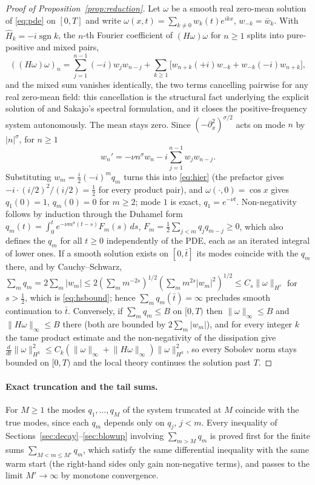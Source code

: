 \documentclass[11pt,a4paper]{article}
\theoremstyle{plain}
\theoremstyle{definition}
\newcommand{\nrm}[1]{\lVert #1 \rVert}
\newcommand{\abs}[1]{\lvert #1 \rvert}
\DeclareMathOperator{\sgn}{sgn}
\begin{document}
\begin{proof}[Proof of Proposition~\ref{prop:reduction}]
Let $\omega$ be a smooth real zero-mean solution of \eqref{eq:pde} on $[0,T]$ and write $\omega(x,t)=\sum_{k\ne0}w_k(t)e^{ikx}$, $w_{-k}=\bar w_k$. With $\hat H_k=-i\sgn k$, the $n$-th Fourier coefficient of $(H\omega)\omega$ for $n\ge1$ splits into pure-positive and mixed pairs,
\[
((H\omega)\omega)_n=\sum_{j=1}^{n-1}(-i)w_jw_{n-j}+\sum_{k\ge1}\big[w_{n+k}(+i)w_{-k}+w_{-k}(-i)w_{n+k}\big],
\]
and the mixed sum vanishes identically, the two terms cancelling pairwise for any real zero-mean field: this cancellation is the structural fact underlying the explicit solution of \cite{CLM85} and Sakajo's spectral formulation, and it closes the positive-frequency system autonomously. The mean stays zero. Since $(-\partial_x^2)^{\sigma/2}$ acts on mode $n$ by $\abs n^\sigma$, for $n\ge1$
\[
w_n'=-\nu n^\sigma w_n-i\sum_{j=1}^{n-1}w_jw_{n-j}.
\]
Substituting $w_m=\tfrac i2(-i)^mq_m$ turns this into \eqref{eq:hier} (the prefactor gives $-i\cdot(i/2)^2/(i/2)=\tfrac12$ for every product pair), and $\omega(\cdot,0)=\cos x$ gives $q_1(0)=1$, $q_m(0)=0$ for $m\ge2$; mode $1$ is exact, $q_1=e^{-\nu t}$. Non-negativity follows by induction through the Duhamel form $q_m(t)=\int_0^te^{-\nu m^\sigma(t-s)}F_m(s)\,ds$, $F_m=\tfrac12\sum_{j<m}q_jq_{m-j}\ge0$, which also defines the $q_m$ for all $t\ge0$ independently of the PDE, each as an iterated integral of lower ones. If a smooth solution exists on $[0,\bar t]$ its modes coincide with the $q_m$ there, and by Cauchy--Schwarz, $\sum_mq_m=2\sum_m\abs{w_m}\le2(\sum_mm^{-2s})^{1/2}(\sum_mm^{2s}\abs{w_m}^2)^{1/2}\le C_s\nrm{\omega}_{H^s}$ for $s>\tfrac12$, which is \eqref{eq:hsbound}; hence $\sum_mq_m(\bar t)=\infty$ precludes smooth continuation to $\bar t$. Conversely, if $\sum_mq_m\le B$ on $[0,T)$ then $\nrm{\omega}_\infty\le B$ and $\nrm{H\omega}_\infty\le B$ there (both are bounded by $2\sum_m\abs{w_m}$), and for every integer $k$ the tame product estimate and the non-negativity of the dissipation give $\frac{d}{dt}\nrm{\omega}_{H^k}^2\le C_k(\nrm{\omega}_\infty+\nrm{H\omega}_\infty)\nrm{\omega}_{H^k}^2$, so every Sobolev norm stays bounded on $[0,T)$ and the local theory continues the solution past $T$.
\end{proof}

\paragraph{Exact truncation and the tail sums.} For $M\ge1$ the modes $q_1,\dots,q_M$ of the system truncated at $M$ coincide with the true modes, since each $q_m$ depends only on $q_j$, $j<m$. Every inequality of Sections~\ref{sec:decay}--\ref{sec:blowup} involving $\sum_{m>M}q_m$ is proved first for the finite sums $\sum_{M<m\le M'}q_m$, which satisfy the same differential inequality with the same warm start (the right-hand sides only gain non-negative terms), and passes to the limit $M'\to\infty$ by monotone convergence.
\end{document}
